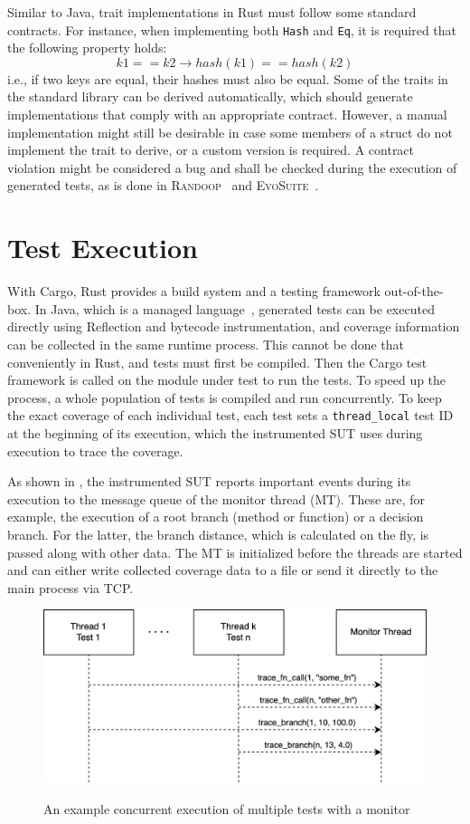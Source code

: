 \documentclass[paper=a4,%
  twoside,%
  BCOR4mm,%
  abstract=true,%
  toc=bibliography,%
  chapterprefix=true,%
  toc=bibliographynumbered,%
  open=right,%
  english,%
  pagesize=pdftex]{scrreprt}
\begin{document}
Similar to Java, trait implementations in Rust must follow some standard contracts. For instance, when implementing both \lstinline{Hash} and \lstinline{Eq}, it is required that the following property holds:
\[
k1 == k2 \longrightarrow hash(k1) == hash(k2)
\]
i.e., if two keys are equal, their hashes must also be equal. Some of the traits in the standard library can be derived automatically, which should generate implementations that comply with an appropriate contract. However, a manual implementation might still be desirable in case some members of a struct do not implement the trait to derive, or a custom version is required. A contract violation might be considered a bug and shall be checked during the execution of generated tests, as is done in \textsc{Randoop}~\cite{Pacheco_2007} and \textsc{EvoSuite}~\cite{Fraser2013}.

\section{Test Execution}
With Cargo, Rust provides a build system and a testing framework out-of-the-box. In Java, which is a managed language~\cite{Gough2005}, generated tests can be executed directly using Reflection and bytecode instrumentation, and coverage information can be collected in the same runtime process. This cannot be done that conveniently in Rust, and tests must first be compiled. Then the Cargo test framework is called on the module under test to run the tests. To speed up the process, a whole population of tests is compiled and run concurrently. To keep the exact coverage of each individual test, each test sets a \lstinline{thread_local} test ID at the beginning of its execution, which the instrumented \ac{SUT} uses during execution to trace the coverage.

As shown in , the instrumented \ac{SUT} reports important events during its execution to the message queue of the monitor thread (MT). These are, for example, the execution of a root branch (method or function) or a decision branch. For the latter, the branch distance, which is calculated on the fly, is passed along with other data. The MT is initialized before the threads are started and can either write collected coverage data to a file or send it directly to the main process via \ac{TCP}.

\begin{figure}[h]
\caption{An example concurrent execution of multiple tests with a monitor}
\centering
\includegraphics[width=\textwidth]{test-execution}
\label{fig:test-execution}
\end{figure}
\end{document}
